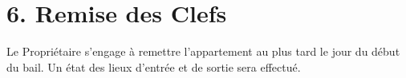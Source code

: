 \section*{6. Remise des Clefs}
Le Propriétaire s'engage à remettre l'appartement au plus tard le jour du début du bail. Un état des lieux d'entrée et de sortie sera effectué.

